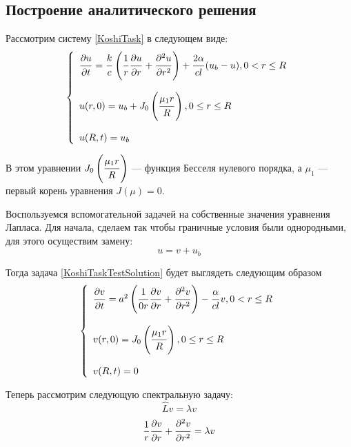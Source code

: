 \documentclass[a4paper,12pt,russian, fleqn]{extreport}
\begin{document}
	\subsection{Построение аналитического решения}
	Рассмотрим систему \eqref{KoshiTask} в следующем виде:
	\begin{equation}\label{KoshiTaskTestSolution}
		\left \{\begin{array}{l}
		\dfrac{\strut \partial u}{\strut \partial t} = \dfrac{\strut k}{\strut c} \left ( \dfrac{\strut 1}{\strut r}\dfrac{\strut \partial u}{\strut \partial r} + \dfrac{\strut \partial^2 u}{\strut \partial r^2}\right ) + \dfrac{2\strut \alpha}{\strut cl}(u_b - u), 0 < r \leq R\\
		\\
		u(r, 0) = u_b + J_0\left(\dfrac{\strut \mu_1 r}{\strut R}\right), 0 \leq r \leq R \\
		\\
		u(R, t) = u_b
		\end{array}\right.
	\end{equation}
	
	В этом уравнении $J_0 \left ( \dfrac{\strut \mu_1 r}{\strut R} \right)$ --- функция Бесселя нулевого порядка, а $\mu_1$ --- первый корень уравнения $J \left( \mu \right) = 0$.
	
	Воспользуемся вспомогательной задачей на собственные значения уравнения Лапласа. Для начала, сделаем так чтобы граничные условия были однородными, для этого осуществим замену:
	\begin{equation*}
	u = v + u_b
	\end{equation*}
	
	Тогда задача \eqref{KoshiTaskTestSolution} будет выглядеть следующим образом
	\begin{equation}\label{KoshiTaskTestSolutionUniform}
	\left \{\begin{array}{l}
	\dfrac{\strut \partial v}{\strut \partial t} = a^2 \left ( \dfrac{\strut 1}{\strut 0r}\dfrac{\strut \partial v}{\strut \partial r} + \dfrac{\strut \partial^2 v}{\strut \partial r^2}\right ) - \dfrac{\strut \alpha}{\strut cl}v, 0 < r \leq R\\
	\\
	v(r, 0) = J_0\left(\dfrac{\strut \mu_1 r}{\strut R}\right), 0 \leq r \leq R \\
	\\
	v(R, t) = 0
	\end{array}\right.
	\end{equation}
	
	Теперь рассмотрим следующую спектральную задачу:
	\begin{equation*}
	\hat{L}v = \lambda v
	\end{equation*}
	\begin{equation*}
	\dfrac{1}{r}\dfrac{\strut \partial v}{\strut \partial r} + \dfrac{\strut \partial^2 v}{\strut \partial r^2} = \lambda v
	\end{equation*}
	
\end{document}
